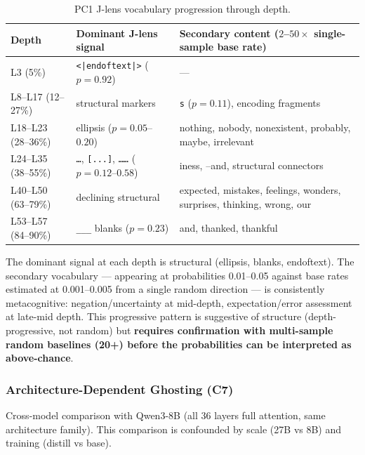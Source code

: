 \documentclass[11pt,a4paper]{article}
\begin{document}
\begin{table}[H]
\centering
\caption{PC1 J-lens vocabulary progression through depth.}
\label{tab:ghost-vocab}
\small
\begin{tabular}{p{2.3cm}p{5cm}p{6cm}}
\toprule
Depth & Dominant J-lens signal & Secondary content ($2$--$50\times$ single-sample base rate) \\
\midrule
L3 (5\%) & \texttt{<|endoftext|>} ($p = 0.92$) & --- \\
L8--L17 (12--27\%) & structural markers & \texttt{s} ($p = 0.11$), encoding fragments \\
L18--L23 (28--36\%) & ellipsis ($p = 0.05$--$0.20$) & nothing, nobody, nonexistent, probably, maybe, irrelevant \\
L24--L35 (38--55\%) & \texttt{\ldots}, \texttt{[...]}, \texttt{\ldots\ldots} ($p = 0.12$--$0.58$) & iness, --and, structural connectors \\
L40--L50 (63--79\%) & declining structural & expected, mistakes, feelings, wonders, surprises, thinking, wrong, our \\
L53--L57 (84--90\%) & \texttt{\_\_\_} blanks ($p = 0.23$) & and, thanked, thankful \\
\bottomrule
\end{tabular}
\end{table}

The dominant signal at each depth is structural (ellipsis, blanks, endoftext). The secondary vocabulary --- appearing at probabilities 0.01--0.05 against base rates estimated at 0.001--0.005 from a single random direction --- is consistently metacognitive: negation/uncertainty at mid-depth, expectation/error assessment at late-mid depth. This progressive pattern is suggestive of structure (depth-progressive, not random) but \textbf{requires confirmation with multi-sample random baselines (20+) before the probabilities can be interpreted as above-chance}.

\subsubsection{Architecture-Dependent Ghosting (C7)}

Cross-model comparison with Qwen3-8B (all 36 layers full attention, same architecture family). This comparison is confounded by scale (27B vs 8B) and training (distill vs base).
\end{document}
